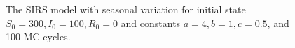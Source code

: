\documentclass[10pt,showpacs,preprintnumbers,amsmath,amssymb,nofootinbib,aps,prl,twocolumn,groupedaddress,superscriptaddress,showkeys]{revtex4-1}
\begin{document}
\begin{figure}[h!tb]
  \\
  \\
  \caption{\label{fig:prob d}The SIRS model with seasonal variation for initial state $S_0=300, I_0=100, R_0=0$ and constants $a=4, b=1, c=0.5$, and 100 MC cycles.}
\end{figure}
\end{document}
